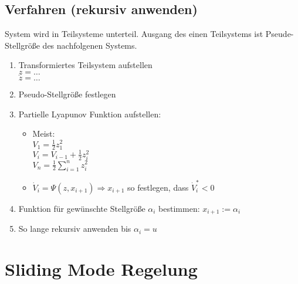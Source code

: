 \documentclass[6pt,a4paper,fleqn]{scrartcl}
\begin{document}
\begin{multicols*}{4}
\subsection{Verfahren (rekursiv anwenden)}

System wird in Teilsysteme unterteil. Ausgang des einen Teilsystems ist Pseude-Stellgröße des nachfolgenen Systems.

\begin{enumerate}
  \item Transformiertes Teilsystem aufstellen\\
    $z = \dots$\\
    $\dot{z} = \dots$
  \item Pseudo-Stellgröße festlegen
  \item Partielle Lyapunov Funktion aufstellen:
    \begin{itemize}
      \item  Meist:\\
        $V_1 = \frac{1}{2} z_1^2$\\
        $V_i = V_{i-1} + \frac{1}{2}z_i^2$ \\
        $V_n = \frac{1}{2} \sum\limits_{i=1}^{n} z_i^2$
      \item $\dot{V}_i = \Psi(z, x_{i+1}) \Rightarrow x_{i+1}$ so festlegen, dass $\dot{V}_i^* < 0$
    \end{itemize}
  \item Funktion für gewünschte Stellgröße $\alpha_i$ bestimmen: $x_{i+1} := \alpha_i$
  \item So lange rekursiv anwenden bis $\alpha_i = u$
\end{enumerate}



\section{Sliding Mode Regelung}


\end{multicols*}
\end{document}
